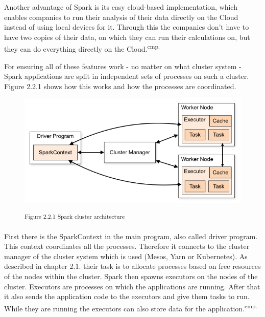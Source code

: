 
Another advantage of Spark is its easy cloud-based implementation, which enables companies to run their analysis of their data directly on the Cloud instead of using local devices for it. Through this the companies don't have to have two copies of their data, on which they can run their calculations on, but they can do everything directly on the Cloud.\textsuperscript{cmp.\cite{23}}


For ensuring all of these features work - no matter on what cluster system - Spark applications are split in independent sets of processes on such a cluster. Figure 2.2.1 shows how this works and how the processes are coordinated.

\begin{figure}[h]
\centering
\includegraphics[width=\textwidth/4*3]{images/spark_cluster_architecture.png}

\textsuperscript{Figure 2.2.1 Spark cluster architecture\cite{24}}
\end{figure}

First there is the SparkContext in the main program, also called driver program. This context coordinates all the processes. Therefore it connects to the cluster manager of the cluster system which is used (Mesos, Yarn or Kubernetes). As described in chapter 2.1. their task is to allocate processes based on free resources of the nodes within the cluster. Spark then spawns executors on the nodes of the cluster. Executors are processes on which the applications are running. After that it also sends the application code to the executors and give them tasks to run. While they are running the executors can also store data for the application.\textsuperscript{cmp.\cite{25}}

